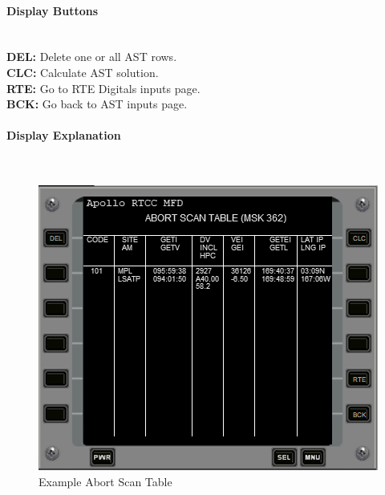 \documentclass[11pt]{article} %
\begin{document}
\paragraph{Display Buttons}\mbox{} \\
\textbf{DEL:} Delete one or all AST rows.\\
\textbf{CLC:} Calculate AST solution.\\
\textbf{RTE:} Go to RTE Digitals inputs page.\\
\textbf{BCK:} Go back to AST inputs page.\\

\paragraph{Display Explanation}\mbox{} \\

\begin{figure}[hp]
	\centering
		\includegraphics{./ApolloRTCCMFDFiles/Apollo11TEIASTExample.png}
	\caption{Example Abort Scan Table}
	\label{fig:Apollo11TEIASTExample}
\end{figure}
\end{document}
